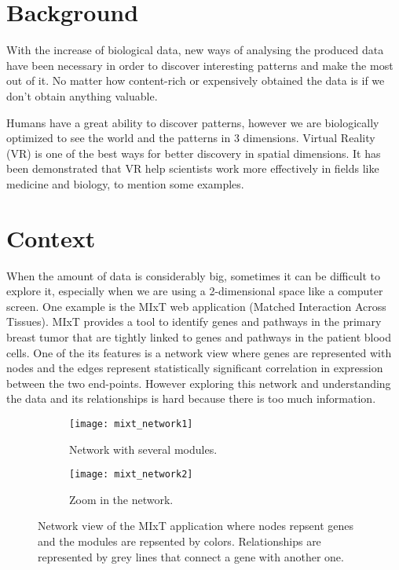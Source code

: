\section{Background}
With the increase of biological data, new ways of analysing the produced data have been necessary in order to discover interesting patterns  and make the most out of it. No matter how content-rich or expensively obtained the data is if we don’t obtain anything valuable.

Humans have a great ability to discover patterns, however we are biologically optimized to see the world and the patterns in 3 dimensions. Virtual Reality (VR) is one of the best ways for better discovery in spatial dimensions. It has been demonstrated that VR help scientists work more effectively in fields like medicine \cite{Laver11}\cite{xia_ip_samman_wong_gateno_wang_yeung_kot_tideman_2001} and biology\cite{10.1093/bioinformatics/bti581}, to mention some examples.

\section{Context}
When the amount of data is considerably big, sometimes it can be difficult to explore it, especially when we are using a 2-dimensional space like a computer screen. One example is the MIxT web application (Matched Interaction Across Tissues)\cite{fjukstad_dumeaux_olsen_lund_hallett_bongo_2017}\cite{dumeaux_fjukstad_interactions_tumor_blood}. MIxT provides a tool to identify genes and pathways in the primary breast tumor that are tightly linked to genes and pathways in the patient blood cells\cite{dumeaux_fjukstad_interactions_tumor_blood}. One of the its features is a network view where genes are represented with nodes and the edges represent statistically significant correlation in expression between the two end-points. However exploring this network and understanding the data and its relationships is hard because there is too much information.

\begin{figure}[h!]
    \newlength{\tempheight}
    \setlength{\tempheight}{15ex}
    \centering%
    \begin{subfigure}[t]{0.5\textwidth}
        \centering%
        \texttt{[image: mixt\_network1]}
        \caption{Network with several modules.}
        \label{fig:mixt_network1}
    \end{subfigure}%
    \begin{subfigure}[t]{0.5\textwidth}
        \centering%
        \texttt{[image: mixt\_network2]}
        \caption{Zoom in the network.}
        \label{fig:mixt_network_zoom}
    \end{subfigure}

    \caption{Network view of the MIxT application where nodes repsent genes and the modules are repsented by colors. Relationships are represented by grey lines that connect a gene with another one.}
    \label{fig:mixt_network}
\end{figure}

